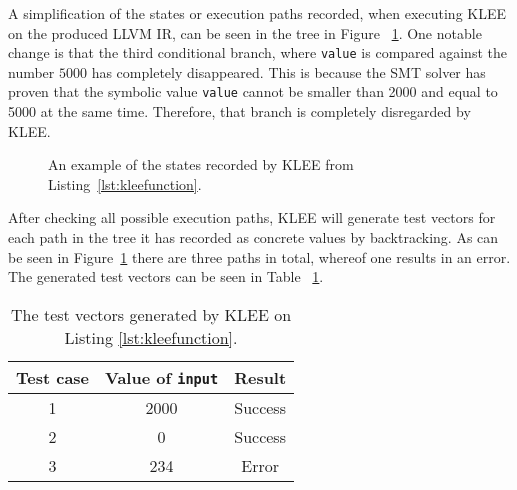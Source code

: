 A simplification of the states or execution paths recorded, when executing KLEE
on the produced LLVM IR, can be seen in the tree in Figure
~\ref{figure:kleetree}.  One notable change is that the third conditional
branch, where \texttt{value} is compared against the number $5000$ has
completely disappeared. This is because the SMT solver has proven that the
symbolic value \texttt{value} cannot be smaller than 2000 and equal to 5000 at
the same time.  Therefore, that branch is completely disregarded by KLEE\@.
\begin{figure}[h]
    \centering
    \caption{An example of the states recorded by KLEE from Listing~\ref{lst:kleefunction}.}
    \label{figure:kleetree}
\end{figure}
After checking all possible execution paths, KLEE will generate test vectors
for each path in the tree it has recorded as concrete values by backtracking.
As can be seen in Figure~\ref{figure:kleetree} there are three paths in total,
whereof one results in an error. The generated test vectors can be seen in Table
~\ref{tab:kleeexample}.

\begin{table}[h]
    \centering
    \begin{tabular}{||c c c||}
        \hline
        Test case & Value of \texttt{input} & Result \\ [0.5ex]
        \hline\hline
        1 & 2000 & Success\\
        \hline
        2 & 0 & Success \\
        \hline
        3 & 234 & Error \\
        \hline
    \end{tabular}
    \caption{The test vectors generated by KLEE on Listing \ref{lst:kleefunction}.}
    \label{tab:kleeexample}
\end{table}

